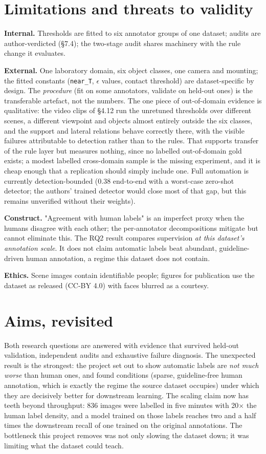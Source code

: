 \section{Limitations and threats to validity}

\textbf{Internal.} Thresholds are fitted to six annotator groups of one dataset; audits are author-verdicted (\S7.4); the two-stage audit shares machinery with the rule change it evaluates.

\textbf{External.} One laboratory domain, six object classes, one camera and mounting; the fitted constants (\texttt{near\_T}, $\epsilon$ values, contact threshold) are dataset-specific by design. The \textit{procedure} (fit on some annotators, validate on held-out ones) is the transferable artefact, not the numbers. The one piece of out-of-domain evidence is qualitative: the video clips of \S4.12 run the unretuned thresholds over different scenes, a different viewpoint and objects almost entirely outside the six classes, and the support and lateral relations behave correctly there, with the visible failures attributable to detection rather than to the rules. That supports transfer of the rule layer but measures nothing, since no labelled out-of-domain gold exists; a modest labelled cross-domain sample is the missing experiment, and it is cheap enough that a replication should simply include one. Full automation is currently detection-bounded (0.38 end-to-end with a worst-case zero-shot detector; the authors' trained detector would close most of that gap, but this remains unverified without their weights).

\textbf{Construct.} "Agreement with human labels" is an imperfect proxy when the humans disagree with each other; the per-annotator decompositions mitigate but cannot eliminate this. The RQ2 result compares supervision \textit{at this dataset's annotation scale}. It does not claim automatic labels beat abundant, guideline-driven human annotation, a regime this dataset does not contain.

\textbf{Ethics.} Scene images contain identifiable people; figures for publication use the dataset as released (CC-BY 4.0) with faces blurred as a courtesy.

\section{Aims, revisited}

Both research questions are answered with evidence that survived held-out validation, independent audits and exhaustive failure diagnosis. The unexpected result is the strongest: the project set out to show automatic labels are \textit{not much worse} than human ones, and found conditions (sparse, guideline-free human annotation, which is exactly the regime the source dataset occupies) under which they are decisively better for downstream learning. The scaling claim now has teeth beyond throughput: 836 images were labelled in five minutes with 20$\times$ the human label density, and a model trained on those labels reaches two and a half times the downstream recall of one trained on the original annotations. The bottleneck this project removes was not only slowing the dataset down; it was limiting what the dataset could teach.
